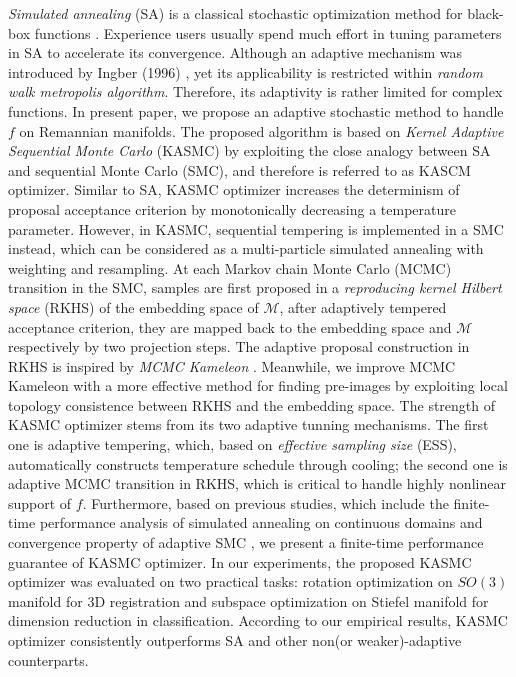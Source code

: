 \documentclass{article} %
\begin{document}
\emph{Simulated annealing} (SA) is a classical stochastic optimization method for black-box functions \cite{SA}. 
Experience users usually spend much effort in tuning parameters in SA to accelerate its convergence. 
Although an adaptive mechanism was introduced by Ingber (1996) \cite{ASA}, yet its applicability is restricted within
\emph{random walk metropolis algorithm}. 
Therefore, its adaptivity is rather limited for complex functions.     
In present paper, we propose an adaptive stochastic method to 
handle $f$ on Remannian manifolds. 
The proposed algorithm is based on \emph{Kernel Adaptive Sequential Monte Carlo}     
(KASMC) by exploiting the close analogy between SA and sequential Monte Carlo (SMC), and therefore is referred to as KASCM optimizer.    
Similar to SA, KASMC optimizer increases the determinism of proposal acceptance criterion by monotonically decreasing a temperature parameter.     
However, in KASMC, sequential tempering is implemented in a SMC instead, which can be considered as a multi-particle simulated annealing \cite{multi_particle_SA} 
with weighting and resampling.      
At each Markov chain Monte Carlo (MCMC) transition in the SMC, samples are first proposed in a \emph{reproducing kernel Hilbert space} (RKHS) of the embedding space  
of $\mathcal{M}$, after adaptively tempered acceptance criterion, they are mapped back to the embedding space and $\mathcal{M}$ respectively by two projection steps.     
The adaptive proposal construction in RKHS is inspired by \emph{MCMC Kameleon} \cite{MCMC_Kameleon}. Meanwhile, we improve MCMC Kameleon with a more effective 
method for finding pre-images by exploiting local topology consistence between RKHS and the embedding space.      
The strength of KASMC optimizer stems from its two adaptive  
tunning mechanisms. The first one is adaptive tempering, which, based on \emph{effective sampling size} (ESS), automatically constructs temperature schedule 
through cooling; 
the second one is adaptive MCMC transition in RKHS, which is 
critical to handle highly nonlinear support of $f$. 
Furthermore, based on previous studies, which include the finite-time performance analysis of simulated annealing on continuous domains \cite{SA_finite_time_2, SA_finite_time}         
and convergence property of adaptive SMC \cite{convergence_ASMC}, 
we present a finite-time performance guarantee of KASMC optimizer.   
In our experiments, the proposed KASMC optimizer was evaluated on two practical tasks: rotation optimization on $SO(3)$ manifold for 3D registration and 
subspace optimization on Stiefel manifold for dimension reduction in classification. According to our empirical results, KASMC optimizer consistently 
outperforms SA and other non(or weaker)-adaptive counterparts.   
\end{document}
